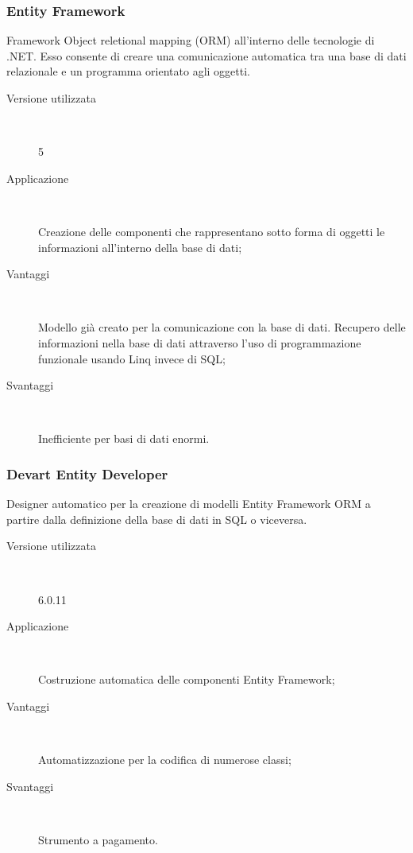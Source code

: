 \documentclass[../RelazioneFinale.tex]{subfiles}
\begin{document}
			\subsubsection{Entity Framework}
				Framework Object reletional mapping (ORM) all'interno delle tecnologie di .NET. Esso consente di creare una comunicazione automatica tra una base di dati relazionale e un programma orientato agli oggetti.
				\begin{description}
					\item[Versione utilizzata] \ \par 
					5
					\item[Applicazione] \ \par
					Creazione delle componenti che rappresentano sotto forma di oggetti le informazioni all'interno della base di dati;
					\item[Vantaggi] \ \par
					Modello già creato per la comunicazione con la base di dati. Recupero delle informazioni nella base di dati attraverso l'uso di programmazione funzionale usando Linq invece di SQL;
					\item[Svantaggi] \ \par
					Inefficiente per basi di dati enormi.
				\end{description}
				
			\subsubsection{Devart Entity Developer}
				Designer automatico per la creazione di modelli Entity Framework ORM a partire dalla definizione della base di dati in SQL o viceversa.
				\begin{description}
					\item[Versione utilizzata] \ \par 
					6.0.11
					\item[Applicazione] \ \par
					Costruzione automatica delle componenti Entity Framework;
					\item[Vantaggi] \ \par
					Automatizzazione per la codifica di numerose classi;
					\item[Svantaggi] \ \par
					Strumento a pagamento.
				\end{description}
				
\end{document}
